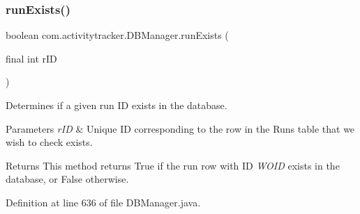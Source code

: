 \mbox{\label{classcom_1_1activitytracker_1_1_d_b_manager_a723ac1c573bacdd0b62894357bd65a9b}} 
\subsubsection{\texorpdfstring{run\+Exists()}{runExists()}}
{\footnotesize\ttfamily boolean com.\+activitytracker.\+D\+B\+Manager.\+run\+Exists (\begin{DoxyParamCaption}\item[{final int}]{r\+ID }\end{DoxyParamCaption})}

Determines if a given run ID exists in the database.


\begin{DoxyParams}{Parameters}
{\em r\+ID} & Unique ID corresponding to the row in the Runs table that we wish to check exists.\\
\hline
\end{DoxyParams}
\begin{DoxyReturn}{Returns}
This method returns True if the run row with ID {\itshape W\+O\+ID} exists in the database, or False otherwise. 
\end{DoxyReturn}


Definition at line 636 of file D\+B\+Manager.\+java.


